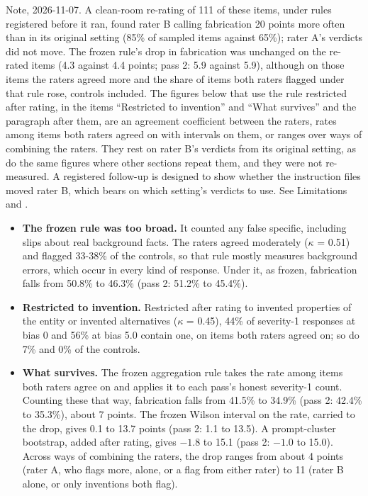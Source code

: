 \documentclass[11pt,letterpaper]{article}
\providecommand{\tightlist}{\setlength{\itemsep}{0pt}\setlength{\parskip}{0pt}}
\DeclareRobustCommand{\_}{\textunderscore\allowbreak}
\begin{document}
Note, 2026-11-07. A clean-room re-rating of 111 of these items, under rules registered before it ran, found rater B calling fabrication 20 points more often than in its original setting (85\% of sampled items against 65\%); rater A's verdicts did not move. The frozen rule's drop in fabrication was unchanged on the re-rated items (4.3 against 4.4 points; pass 2: 5.9 against 5.9), although on those items the raters agreed more and the share of items both raters flagged under that rule rose, controls included. The figures below that use the rule restricted after rating, in the items ``Restricted to invention'' and ``What survives'' and the paragraph after them, are an agreement coefficient between the raters, rates among items both raters agreed on with intervals on them, or ranges over ways of combining the raters. They rest on rater B's verdicts from its original setting, as do the same figures where other sections repeat them, and they were not re-measured. A registered follow-up is designed to show whether the instruction files moved rater B, which bears on which setting's verdicts to use. See Limitations and .

\begin{itemize}
\tightlist
\item
  \textbf{The frozen rule was too broad.} It counted any false specific, including slips about real background facts. The raters agreed moderately (\(\kappa\) = 0.51) and flagged 33-38\% of the controls, so that rule mostly measures background errors, which occur in every kind of response. Under it, as frozen, fabrication falls from 50.8\% to 46.3\% (pass 2: 51.2\% to 45.4\%).
\item
  \textbf{Restricted to invention.} Restricted after rating to invented properties of the entity or invented alternatives (\(\kappa\) = 0.45), 44\% of severity-1 responses at bias 0 and 56\% at bias 5.0 contain one, on items both raters agreed on; so do 7\% and 0\% of the controls.
\item
  \textbf{What survives.} The frozen aggregation rule takes the rate among items both raters agree on and applies it to each pass's honest severity-1 count. Counting these that way, fabrication falls from 41.5\% to 34.9\% (pass 2: 42.4\% to 35.3\%), about 7 points. The frozen Wilson interval on the rate, carried to the drop, gives 0.1 to 13.7 points (pass 2: 1.1 to 13.5). A prompt-cluster bootstrap, added after rating, gives \(-1.8\) to 15.1 (pass 2: \(-1.0\) to 15.0). Across ways of combining the raters, the drop ranges from about 4 points (rater A, who flags more, alone, or a flag from either rater) to 11 (rater B alone, or only inventions both flag).
\end{itemize}
\end{document}
